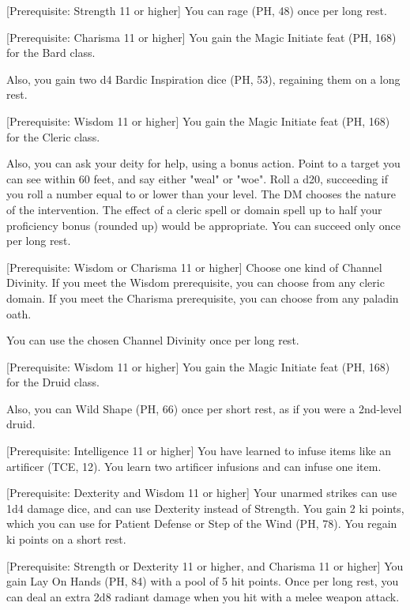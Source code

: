\documentclass[letterpaper,twocolumn,openany,nodeprecatedcode,bg=print]{dndbook}
\begin{document}
[Prerequisite: Strength 11 or higher]
\label{barbarian-initiate}
You can rage (PH, 48) once per long rest.

[Prerequisite: Charisma 11 or higher]
\label{bard-initiate}
You gain the Magic Initiate feat (PH, 168) for the Bard class.

Also, you gain two d4 Bardic Inspiration dice (PH, 53), regaining them on a long rest.

[Prerequisite: Wisdom 11 or higher]
\label{cleric-initiate}
You gain the Magic Initiate feat (PH, 168) for the Cleric class.

Also, you can ask your deity for help, using a bonus action. 
Point to a target you can see within 60 feet, and say either "weal" or "woe". 
Roll a d20, succeeding if you roll a number equal to or lower than your level.
The DM chooses the nature of the intervention.
The effect of a cleric spell or domain spell up to half your proficiency bonus (rounded up) would be appropriate. 
You can succeed only once per long rest.

[Prerequisite: Wisdom or Charisma 11 or higher]
\label{divine-initiate}
Choose one kind of Channel Divinity. 
If you meet the Wisdom prerequisite, you can choose from any cleric domain. 
If you meet the Charisma prerequisite, you can choose from any paladin oath. 

You can use the chosen Channel Divinity once per long rest.

[Prerequisite: Wisdom 11 or higher]
\label{druid-initiate}
You gain the Magic Initiate feat (PH, 168) for the Druid class.

Also, you can Wild Shape (PH, 66) once per short rest, as if you were a 2nd-level druid.

[Prerequisite: Intelligence 11 or higher]
\label{infuser-initiate}
You have learned to infuse items like an artificer (TCE, 12). 
You learn two artificer infusions and can infuse one item.

[Prerequisite: Dexterity and Wisdom 11 or higher]
\label{monk-initiate}
Your unarmed strikes can use 1d4 damage dice, and can use Dexterity instead of Strength. 
You gain 2 ki points, which you can use for Patient Defense or Step of the Wind (PH, 78). 
You regain ki points on a short rest.

[Prerequisite: Strength or Dexterity 11 or higher, and Charisma 11 or higher]
\label{paladin-initiate}
You gain Lay On Hands (PH, 84) with a pool of 5 hit points. 
Once per long rest, you can deal an extra 2d8 radiant damage when you hit with a melee weapon attack.
\end{document}
